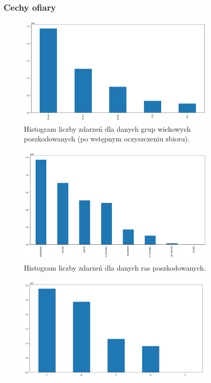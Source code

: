 \documentclass{classrep}
\begin{document}
{{            \subsubsection{Cechy ofiary} {
                \begin{figure}[!htbp]
                    \centering
                    \includegraphics[width=0.85\textwidth]{img/hist_vic_age_group.png}
                    \caption{Histogram liczby zdarzeń dla danych grup wiekowych poszkodowanych (po wstępnym oczyszczeniu zbioru).}
                    \label{hist_vic_age_group}
                \end{figure}
                \begin{figure}[!htbp]
                    \centering
                    \includegraphics[width=0.85\textwidth]{img/hist_vic_race.png}
                    \caption{Histogram liczby zdarzeń dla danych ras poszkodowanych.}
                    \label{hist_vic_race}
                \end{figure}
                \begin{figure}[!htbp]
                    \centering
                    \includegraphics[width=0.85\textwidth]{img/hist_vic_sex.png}

\end{figure}}}}
\end{document}
